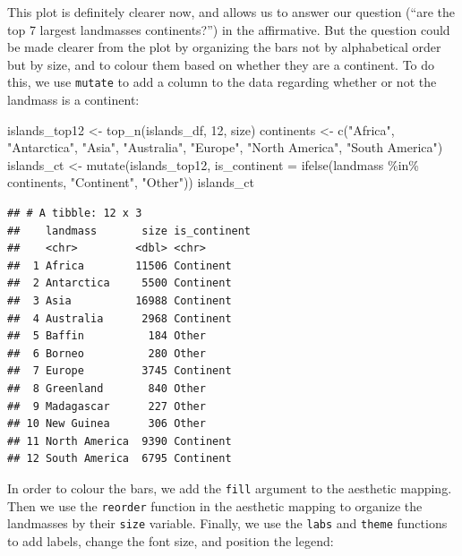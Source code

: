 \documentclass[
]{krantz}
\makeatletter
\newenvironment{Shaded}{\begin{snugshade}}{\end{snugshade}}
\newcommand{\AttributeTok}[1]{\textcolor[rgb]{0.61,0.61,0.61}{#1}}
\newcommand{\DecValTok}[1]{\textcolor[rgb]{0.06,0.06,0.06}{#1}}
\newcommand{\FunctionTok}[1]{\textcolor[rgb]{0,0,0}{#1}}
\newcommand{\NormalTok}[1]{#1}
\newcommand{\OtherTok}[1]{\textcolor[rgb]{0.37,0.37,0.37}{#1}}
\newcommand{\SpecialCharTok}[1]{\textcolor[rgb]{0,0,0}{#1}}
\newcommand{\StringTok}[1]{\textcolor[rgb]{0.5,0.5,0.5}{#1}}
\newenvironment{kframe}{%
\medskip{}
\setlength{\fboxsep}{.8em}
 \def\at@end@of@kframe{}%
 \ifinner\ifhmode%
  \def\at@end@of@kframe{\end{minipage}}%
  \begin{minipage}{\columnwidth}%
 \fi\fi%
 \def\FrameCommand##1{\hskip\@totalleftmargin \hskip-\fboxsep
 \colorbox{shadecolor}{##1}\hskip-\fboxsep
     \hskip-\linewidth \hskip-\@totalleftmargin \hskip\columnwidth}%
 \MakeFramed {\advance\hsize-\width
   \@totalleftmargin\z@ \linewidth\hsize
   \@setminipage}}%
 {\par\unskip\endMakeFramed%
 \at@end@of@kframe}
\renewenvironment{Shaded}{\begin{kframe}}{\end{kframe}}
\makeatother
\begin{document}
This plot is definitely clearer now, and allows us to answer our question (``are the top 7 largest landmasses continents?'') in
the affirmative. But the question could be made clearer from the plot by organizing the bars not by alphabetical order
but by size, and to colour them based on whether they are a continent. To do this, we
use \texttt{mutate} to add a column to the data regarding whether or not the landmass is a continent:

\begin{Shaded}
\begin{Highlighting}[]
\NormalTok{islands\_top12 }\OtherTok{\textless{}{-}} \FunctionTok{top\_n}\NormalTok{(islands\_df, }\DecValTok{12}\NormalTok{, size)}
\NormalTok{continents }\OtherTok{\textless{}{-}} \FunctionTok{c}\NormalTok{(}\StringTok{"Africa"}\NormalTok{, }\StringTok{"Antarctica"}\NormalTok{, }\StringTok{"Asia"}\NormalTok{, }\StringTok{"Australia"}\NormalTok{, }\StringTok{"Europe"}\NormalTok{, }\StringTok{"North America"}\NormalTok{, }\StringTok{"South America"}\NormalTok{)}
\NormalTok{islands\_ct }\OtherTok{\textless{}{-}} \FunctionTok{mutate}\NormalTok{(islands\_top12, }\AttributeTok{is\_continent =} \FunctionTok{ifelse}\NormalTok{(landmass }\SpecialCharTok{\%in\%}\NormalTok{ continents, }\StringTok{"Continent"}\NormalTok{, }\StringTok{"Other"}\NormalTok{))}
\NormalTok{islands\_ct}
\end{Highlighting}
\end{Shaded}

\begin{verbatim}
## # A tibble: 12 x 3
##    landmass       size is_continent
##    <chr>         <dbl> <chr>       
##  1 Africa        11506 Continent   
##  2 Antarctica     5500 Continent   
##  3 Asia          16988 Continent   
##  4 Australia      2968 Continent   
##  5 Baffin          184 Other       
##  6 Borneo          280 Other       
##  7 Europe         3745 Continent   
##  8 Greenland       840 Other       
##  9 Madagascar      227 Other       
## 10 New Guinea      306 Other       
## 11 North America  9390 Continent   
## 12 South America  6795 Continent
\end{verbatim}

In order to colour the bars, we add the \texttt{fill} argument to the aesthetic mapping. Then we use the \texttt{reorder}
function in the aesthetic mapping to organize the landmasses by their \texttt{size} variable.
Finally, we use the \texttt{labs} and \texttt{theme} functions to add labels, change the font size, and position the legend:
\end{document}
